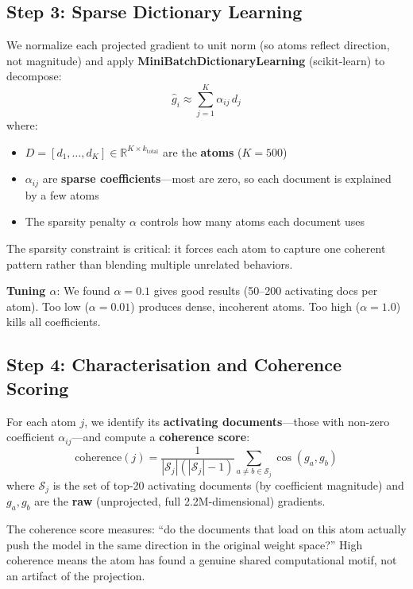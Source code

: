 \documentclass{article} %
\begin{document}
\subsection{Step 3: Sparse Dictionary Learning}

We normalize each projected gradient to unit norm (so atoms reflect direction, not magnitude) and apply \textbf{MiniBatchDictionaryLearning} (scikit-learn) to decompose:
\begin{equation}
\hat{g}_i \approx \sum_{j=1}^{K} \alpha_{ij} \, d_j
\end{equation}
where:
\begin{itemize}
\item $D = [d_1, \ldots, d_K] \in \mathbb{R}^{K \times k_{\text{total}}}$ are the \textbf{atoms} ($K = 500$)
\item $\alpha_{ij}$ are \textbf{sparse coefficients}---most are zero, so each document is explained by a few atoms
\item The sparsity penalty $\alpha$ controls how many atoms each document uses
\end{itemize}

The sparsity constraint is critical: it forces each atom to capture one coherent pattern rather than blending multiple unrelated behaviors.

\textbf{Tuning $\alpha$}: We found $\alpha = 0.1$ gives good results (50--200 activating docs per atom). Too low ($\alpha = 0.01$) produces dense, incoherent atoms. Too high ($\alpha = 1.0$) kills all coefficients.

\subsection{Step 4: Characterisation and Coherence Scoring}

For each atom $j$, we identify its \textbf{activating documents}---those with non-zero coefficient $\alpha_{ij}$---and compute a \textbf{coherence score}:
\begin{equation}
\text{coherence}(j) = \frac{1}{|\mathcal{S}_j|(|\mathcal{S}_j|-1)} \sum_{a \neq b \in \mathcal{S}_j} \cos(g_a, g_b)
\end{equation}
where $\mathcal{S}_j$ is the set of top-20 activating documents (by coefficient magnitude) and $g_a, g_b$ are the \textbf{raw} (unprojected, full 2.2M-dimensional) gradients.

The coherence score measures: ``do the documents that load on this atom actually push the model in the same direction in the original weight space?'' High coherence means the atom has found a genuine shared computational motif, not an artifact of the projection.
\end{document}
